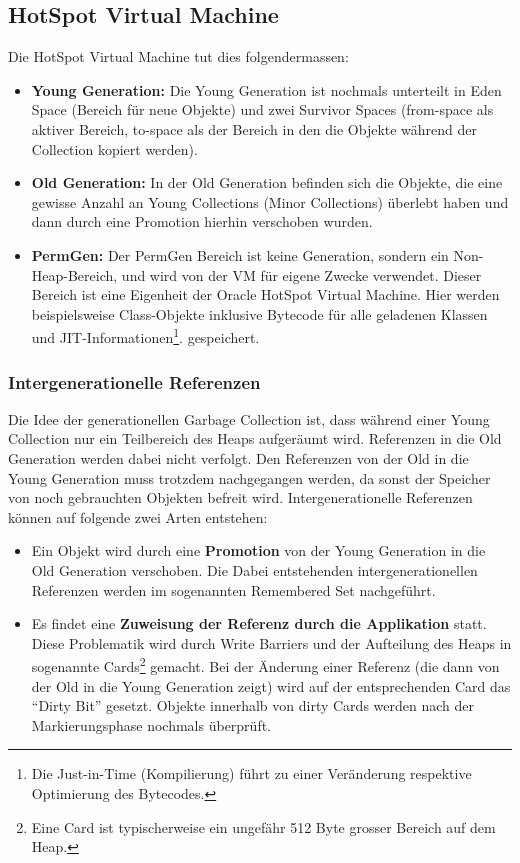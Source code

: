 \subsection{HotSpot Virtual Machine}
Die HotSpot Virtual Machine tut dies folgendermassen\cite{langerkreft201003}:

\begin{itemize}
	\item \textbf{Young Generation:} Die Young Generation ist nochmals unterteilt in Eden Space (Bereich für neue Objekte) und zwei Survivor Spaces (from-space als aktiver Bereich, to-space als der Bereich in den die Objekte während der Collection kopiert werden).
	\item \textbf{Old Generation:} In der Old Generation befinden sich die Objekte, die eine gewisse Anzahl an Young Collections (Minor Collections) überlebt haben und dann durch eine Promotion hierhin verschoben wurden.
	\item  \textbf{PermGen:} Der PermGen Bereich ist keine Generation, sondern ein Non-Heap-Bereich, und wird von der VM für eigene Zwecke verwendet. Dieser Bereich ist eine Eigenheit der Oracle HotSpot Virtual Machine. Hier werden beispielsweise Class-Objekte inklusive Bytecode für alle geladenen Klassen und JIT-Informationen\footnote{Die Just-in-Time (Kompilierung) führt zu einer Veränderung respektive Optimierung des Bytecodes.}. gespeichert.
\end{itemize}

\subsubsection{Intergenerationelle Referenzen}
Die Idee der generationellen Garbage Collection ist, dass während einer Young Collection nur ein Teilbereich des Heaps aufgeräumt wird. Referenzen in die Old Generation werden dabei nicht verfolgt. Den Referenzen von der Old in die Young Generation muss trotzdem nachgegangen werden, da sonst der Speicher von noch gebrauchten Objekten befreit wird. Intergenerationelle Referenzen können auf folgende zwei Arten entstehen:
\begin{itemize}
	\item Ein Objekt wird durch eine  \textbf{Promotion} von der Young Generation in die Old Generation verschoben. Die Dabei entstehenden intergenerationellen Referenzen werden im sogenannten Remembered Set nachgeführt. 
	\item Es findet eine \textbf{Zuweisung der Referenz durch die Applikation} statt. Diese Problematik wird durch Write Barriers und der Aufteilung des Heaps in sogenannte Cards\footnote{Eine Card ist typischerweise ein ungefähr 512 Byte grosser Bereich auf dem Heap.} gemacht. Bei der Änderung einer Referenz (die dann von der Old in die Young Generation zeigt) wird auf der entsprechenden Card das ``Dirty Bit'' gesetzt. Objekte innerhalb von dirty Cards werden nach der Markierungsphase nochmals überprüft.
\end{itemize}

